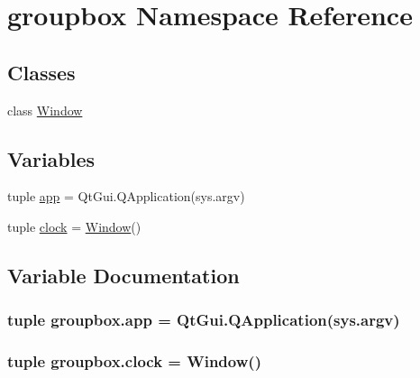 \hypertarget{namespacegroupbox}{}\section{groupbox Namespace Reference}
\label{namespacegroupbox}
\subsection*{Classes}
\begin{DoxyCompactItemize}
\item 
class \hyperlink{classgroupbox_1_1Window}{Window}
\end{DoxyCompactItemize}
\subsection*{Variables}
\begin{DoxyCompactItemize}
\item 
tuple \hyperlink{namespacegroupbox_a0efa6dcf5144cc347216175b664ca331}{app} = Qt\+Gui.\+Q\+Application(sys.\+argv)
\item 
tuple \hyperlink{namespacegroupbox_a6fbcbb4d0723f510b9924fc980f4f404}{clock} = \hyperlink{classgroupbox_1_1Window}{Window}()
\end{DoxyCompactItemize}


\subsection{Variable Documentation}
\hypertarget{namespacegroupbox_a0efa6dcf5144cc347216175b664ca331}{}
\subsubsection[{app}]{\setlength{\rightskip}{0pt plus 5cm}tuple groupbox.\+app = Qt\+Gui.\+Q\+Application(sys.\+argv)}\label{namespacegroupbox_a0efa6dcf5144cc347216175b664ca331}
\hypertarget{namespacegroupbox_a6fbcbb4d0723f510b9924fc980f4f404}{}
\subsubsection[{clock}]{\setlength{\rightskip}{0pt plus 5cm}tuple groupbox.\+clock = {\bf Window}()}\label{namespacegroupbox_a6fbcbb4d0723f510b9924fc980f4f404}
